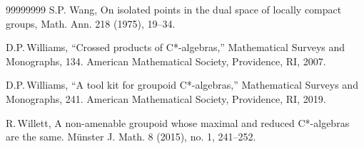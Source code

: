 \documentclass[11 pt, leqno, hidelinks]{amsart}%
\theoremstyle{plain}
\numberwithin{equation}{section}
\begin{document}
\begin{thebibliography}{99999999}
 S.P. Wang, On isolated points in the dual space of locally compact groups, Math. Ann.
218 (1975), 19--34.

 D.P.\,Williams, ``Crossed products of C*-algebras,'' Mathematical Surveys and Monographs, 134. American Mathematical Society, Providence, RI, 2007.

 D.P.\,Williams, ``A tool kit for groupoid C*-algebras,'' Mathematical Surveys and Monographs, 241. American Mathematical Society, Providence, RI, 2019.

 R.\,Willett, A non-amenable groupoid whose maximal and reduced C*-algebras are the same.
M\"unster J. Math. 8 (2015), no. 1, 241--252.

	






\end{thebibliography}
\end{document}
